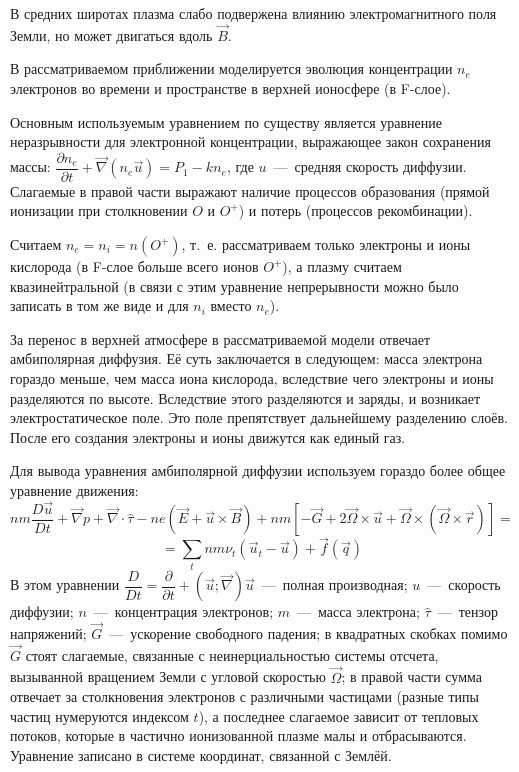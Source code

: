 \documentclass[12pt, a5paper, fleqn, twoside]{article}
\theoremstyle{definiton}
\theoremstyle{definition}
\begin{document}
В средних широтах плазма слабо подвержена влиянию электромагнитного поля Земли, но может двигаться вдоль $\vec{B}$.

\bigskip

В рассматриваемом приближении моделируется эволюция концентрации $n_e$ электронов во времени и пространстве в верхней ионосфере (в F-слое).

\medskip

Основным используемым уравнением по существу является уравнение неразрывности для электронной концентрации, выражающее закон сохранения массы: $\dfrac{\partial n_e}{\partial t}+\vec{\nabla}(n_e \vec{u})=P_1-kn_e$, где $u$~---~средняя скорость диффузии. Слагаемые в правой части выражают наличие процессов образования (прямой ионизации при столкновении $O$ и $O^+$) и потерь (процессов рекомбинации).

Считаем $n_e=n_i = n(O^+)$, т.~е. рассматриваем только электроны и ионы кислорода (в F-слое больше всего ионов $O^+$), а плазму считаем квазинейтральной (в связи с этим уравнение непрерывности можно было записать в том же виде и для $n_i$ вместо $n_e$).

\bigskip

За перенос в верхней атмосфере в рассматриваемой модели отвечает амбиполярная диффузия. Её суть заключается в следующем: масса электрона гораздо меньше, чем масса иона кислорода, вследствие чего электроны и ионы разделяются по высоте. Вследствие этого разделяются и заряды, и возникает электростатическое поле. Это поле препятствует дальнейшему разделению слоёв. После его создания электроны и ионы движутся как единый газ.

Для вывода уравнения амбиполярной диффузии используем гораздо более общее уравнение движения: $$nm\dfrac{D\vec{u}}{Dt}+\vec{\nabla} p + \vec{\nabla}\cdot \hat{\tau} - ne(\vec{E}+\vec{u}\times \vec{B})+nm[-\vec{G}+2\vec{\Omega}\times \vec{u}+\vec{\Omega}\times(\vec{\Omega}\times\vec{r})]=$$
$$=\sum_t nm\nu_t (\vec{u}_t-\vec{u})+ \vec{f}(\vec{q})$$
В этом уравнении $\dfrac{D}{Dt}=\dfrac{\partial}{\partial t}+(\vec{u}; \vec{\nabla})\vec{u}$~---~полная производная; $u$~---~скорость диффузии; $n$~---~концентрация электронов; $m$~---~масса электрона; $\hat{\tau}$~---~тензор напряжений; $\vec{G}$~---~ускорение свободного падения; в квадратных скобках помимо $\vec{G}$ стоят слагаемые, связанные с неинерциальностью системы отсчета, вызыванной вращением Земли с угловой скоростью $\vec{\Omega}$; в правой части сумма отвечает за столкновения электронов с различными частицами (разные типы частиц нумеруются индексом $t$), а последнее слагаемое зависит от тепловых потоков, которые в частично ионизованной плазме малы и отбрасываются. Уравнение записано в системе координат, связанной с Землёй.
\end{document}
